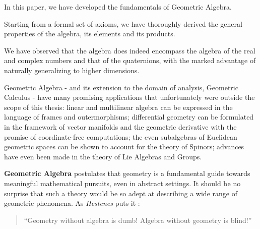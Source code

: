 In this paper, we have developed the fundamentals of Geometric Algebra.

Starting from a formal set of axioms, we have thoroughly derived the general properties of the algebra, its elements and its products.

We have observed that the algebra does indeed encompass the algebra of the real and complex numbers and that of the quaternions, with the marked advantage of naturally generalizing to higher dimensions.

Geometric Algebra - and its extension to the domain of analysis, Geometric Calculus - have many promising applications that unfortunately were outside the scope of this thesis: linear and multilinear algebra can be expressed in the language of frames and outermorphisms; differential geometry can be formulated in the framework of vector manifolds and the geometric derivative with the promise of coordinate-free computations; the even subalgebras of Euclidean geometric spaces can be shown to account for the theory of Spinors; advances have even been made in the theory of Lie Algebras and Groups.

\textbf{Geometric Algebra} postulates that geometry is a fundamental guide towards meaningful mathematical pursuits, even in abstract settings. It should be no surprise that such a theory would be so adept at describing a wide range of geometric phenomena. As \textit{Hestenes} puts it \cite[p. xii]{ga-origin}:
\begin{quote}
	``Geometry without algebra is dumb! Algebra without geometry is blind!''
\end{quote}


